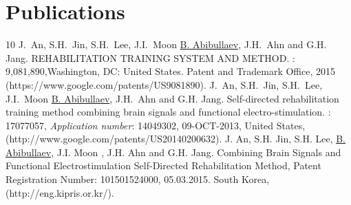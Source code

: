\documentclass[10pt,letterpaper,sans]{moderncv}   %
\begin{document}
\section{Publications}
\renewcommand{\refname}{Patents}
\begin{thebibliography}{10}
    \small
    J.~An, S.H.~Jin, S.H.~Lee, J.I.~Moon  \underline{B. Abibullaev}, J.H.~Ahn and G.H. Jang.
    \newblock REHABILITATION TRAINING SYSTEM AND METHOD.
    : 9,081,890,Washington, DC: United States. Patent and Trademark Office, 2015 (https://www.google.com/patents/US9081890).
    J.~An, S.H.~Jin, S.H.~Lee, J.I.~Moon  \underline{B. Abibullaev}, J.H.~Ahn and G.H. Jang.
    \newblock Self-directed rehabilitation training method combining brain signals and functional electro-stimulation.
    : 17077057, {\em Application number}: 14049302, 09-OCT-2013, United States, (http://www.google.com/patents/US20140200632).
    J. An, S.H. Jin, S.H. Lee, \underline{B. Abibullaev}, J.I. Moon , J.H. Ahn and G.H. Jang. \newblock Combining Brain Signals and Functional Electrostimulation Self-Directed Rehabilitation Method, \newblock Patent Registration Number: 101501524000, 05.03.2015. South Korea,(http://eng.kipris.or.kr/). 
\end{thebibliography}
\vspace{11pt}


\renewcommand{\refname}{Refereed Journal Publications}  
\end{document}
